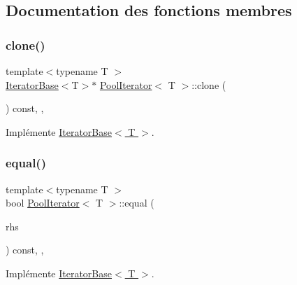 \subsection{Documentation des fonctions membres}
\mbox{\label{class_pool_iterator_ae39cdb4bbb84e88cf0d9009e7bdae586}} 
\subsubsection{\texorpdfstring{clone()}{clone()}}
{\footnotesize\ttfamily template$<$typename T $>$ \\
\hyperlink{class_iterator_base}{Iterator\+Base}$<$T$>$$\ast$ \hyperlink{class_pool_iterator}{Pool\+Iterator}$<$ T $>$\+::clone (\begin{DoxyParamCaption}{ }\end{DoxyParamCaption}) const\hspace{0.3cm}{\ttfamily [inline]}, {\ttfamily [override]}, {\ttfamily [virtual]}}



Implémente \hyperlink{class_iterator_base_a541fdf8cc48f31c8ddfdc3f319a37100}{Iterator\+Base$<$ T $>$}.

\mbox{\label{class_pool_iterator_adbbef39e72972414b1bbb6d6bb885bb1}} 
\subsubsection{\texorpdfstring{equal()}{equal()}}
{\footnotesize\ttfamily template$<$typename T $>$ \\
bool \hyperlink{class_pool_iterator}{Pool\+Iterator}$<$ T $>$\+::equal (\begin{DoxyParamCaption}\item[{const \hyperlink{class_iterator_base}{Iterator\+Base}$<$ T $>$ \&}]{rhs }\end{DoxyParamCaption}) const\hspace{0.3cm}{\ttfamily [inline]}, {\ttfamily [override]}, {\ttfamily [virtual]}}



Implémente \hyperlink{class_iterator_base_a08430515a17384d098eb62ecce1b64c6}{Iterator\+Base$<$ T $>$}.

\mbox{\label{class_pool_iterator_a3acdd751b297473d78eedb7422c7a66c}} 

